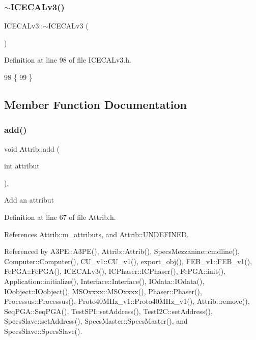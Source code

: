 \subsubsection{\texorpdfstring{$\sim$\+I\+C\+E\+C\+A\+Lv3()}{~ICECALv3()}}
{\footnotesize\ttfamily I\+C\+E\+C\+A\+Lv3\+::$\sim$\+I\+C\+E\+C\+A\+Lv3 (\begin{DoxyParamCaption}{ }\end{DoxyParamCaption})\hspace{0.3cm}{\ttfamily [inline]}}



Definition at line 98 of file I\+C\+E\+C\+A\+Lv3.\+h.


\begin{DoxyCode}
98              \{
99   \}
\end{DoxyCode}


\subsection{Member Function Documentation}
\mbox{\label{classAttrib_a235f773af19c900264a190b00a3b4ad7}} 
\subsubsection{\texorpdfstring{add()}{add()}}
{\footnotesize\ttfamily void Attrib\+::add (\begin{DoxyParamCaption}\item[{int}]{attribut }\end{DoxyParamCaption})\hspace{0.3cm}{\ttfamily [inline]}, {\ttfamily [inherited]}}

Add an attribut 

Definition at line 67 of file Attrib.\+h.



References Attrib\+::m\+\_\+attributs, and Attrib\+::\+U\+N\+D\+E\+F\+I\+N\+ED.



Referenced by A3\+P\+E\+::\+A3\+P\+E(), Attrib\+::\+Attrib(), Specs\+Mezzanine\+::cmdline(), Computer\+::\+Computer(), C\+U\+\_\+v1\+::\+C\+U\+\_\+v1(), export\+\_\+obj(), F\+E\+B\+\_\+v1\+::\+F\+E\+B\+\_\+v1(), Fe\+P\+G\+A\+::\+Fe\+P\+G\+A(), I\+C\+E\+C\+A\+Lv3(), I\+C\+Phaser\+::\+I\+C\+Phaser(), Fe\+P\+G\+A\+::init(), Application\+::initialize(), Interface\+::\+Interface(), I\+Odata\+::\+I\+Odata(), I\+Oobject\+::\+I\+Oobject(), M\+S\+Oxxxx\+::\+M\+S\+Oxxxx(), Phaser\+::\+Phaser(), Processus\+::\+Processus(), Proto40\+M\+Hz\+\_\+v1\+::\+Proto40\+M\+Hz\+\_\+v1(), Attrib\+::remove(), Seq\+P\+G\+A\+::\+Seq\+P\+G\+A(), Test\+S\+P\+I\+::set\+Address(), Test\+I2\+C\+::set\+Address(), Specs\+Slave\+::set\+Address(), Specs\+Master\+::\+Specs\+Master(), and Specs\+Slave\+::\+Specs\+Slave().


